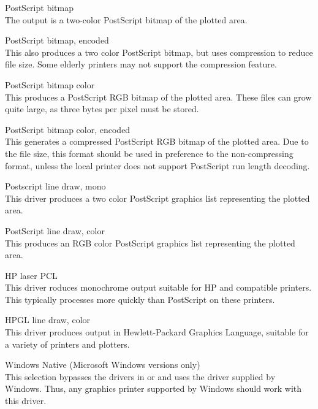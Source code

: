 \begin{description}
\item{\et PostScript bitmap}\\
The output is a two-color PostScript bitmap of the plotted area.

\item{\et PostScript bitmap, encoded}\\
This also produces a two color PostScript bitmap, but uses compression
to reduce file size.  Some elderly printers may not support the
compression feature.

\item{\et PostScript bitmap color}\\
This produces a PostScript RGB bitmap of the plotted area.  These
files can grow quite large, as three bytes per pixel must be stored.

\item{\et PostScript bitmap color, encoded}\\
This generates a compressed PostScript RGB bitmap of the plotted area. 
Due to the file size, this format should be used in preference to the
non-compressing format, unless the local printer does not support
PostScript run length decoding.

\item{\et Postscript line draw, mono}\\
This driver produces a two color PostScript graphics list representing
the plotted area.

\item{\et PostScript line draw, color}\\
This produces an RGB color PostScript graphics list representing the
plotted area.

\item{\et HP laser PCL}\\
This driver roduces monochrome output suitable for HP and compatible
printers.  This typically processes more quickly than PostScript on
these printers.

\item{\et HPGL line draw, color}\\
This driver produces output in Hewlett-Packard Graphics Language,
suitable for a variety of printers and plotters.

\item{\et Windows Native} (Microsoft Windows versions only)\\
This selection bypasses the drivers in {\Xic} or {\WRspice} and uses
the driver supplied by Windows.  Thus, any graphics printer supported
by Windows should work with this driver.


\end{description}
